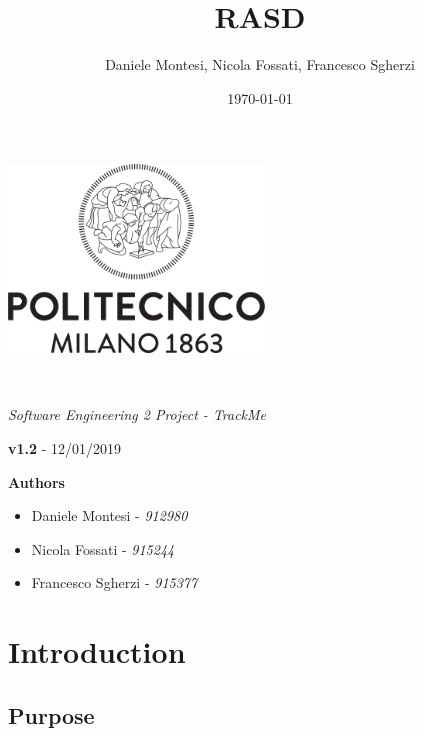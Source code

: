 \documentclass[a4paper,oneside,11pt]{article}
\title{RASD}
\author{Daniele Montesi, Nicola Fossati, Francesco Sgherzi}
\date{\today}
\begin{document}
    \begin{titlingpage} 
        \begin{center}
            \includegraphics[height=5cm]{assets/Logo_Politecnico_Milano.png}\\
            \vspace{4cm}
            \begin{huge} 
                \textbf{\thetitle} \\
            \end{huge}
            \vspace{0.3cm}
            \begin{Large}
                \textit{Software Engineering 2 Project - TrackMe} \\
            \end{Large}
        \end{center}
         \textbf{v1.2} - 12/01/2019 \\

            \vspace{4cm}
             \begin{large}
            \textbf{Authors}
            \begin{itemize}
                \item Daniele Montesi - \textit{912980} 
                \item Nicola Fossati - \textit{915244}
                \item Francesco Sgherzi - \textit{915377}
            \end{itemize}
        \end{large}
    \end{titlingpage}
    \newpage
    \tableofcontents
    \newpage
    \section{Introduction}
    
        \subsection{Purpose}
            
\end{document}
